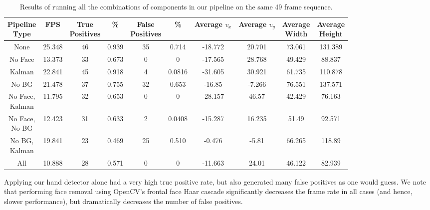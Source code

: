 \documentclass[12pt]{article}
\begin{document}
\noindent
\begin{table}[H]
\begin{center}
\begin{tabular}{|c|c|c|c|c|c|c|c|c|c|}
\hline
\shortstack{Pipeline \\ Type} &		FPS &	\shortstack{True \\ Positives} &	\% &		\shortstack{False \\ Positives }&	 \% &		\shortstack{Average \\ $v_x$} & 	\shortstack{Average \\ $v_y$} & 	\shortstack{Average \\ Width} &	\shortstack{Average \\Height} \\	\hline \hline
None    & 	25.348	  & 	46		        &	0.939     &		35                        &	0.714     &		-18.772 &	20.701 &	73.061 &	131.389	\\ \hline
No Face &	13.373 &	33 &	0.673 &	0 &	0 &	-17.565 &	28.768	& 49.429	& 88.837 \\ \hline
Kalman &	22.841 &	45	&0.918	&4	&0.0816&	-31.605	&30.921	&61.735&	110.878		\\ \hline
No BG	 & 21.478&	37	&0.755	&32	&0.653	&-16.85	&-7.266	&76.551	&137.571		\\ \hline
\shortstack{No Face, \\ Kalman}	&11.795&	32	&0.653&	0	&0&	-28.157	&46.57	&42.429&	76.163	\\ \hline
\shortstack{No Face, \\ No BG}	&12.423&	31	&0.633&	2	&0.0408&	-15.287&	16.235&	51.49&	92.571		\\ \hline
\shortstack{No BG, \\ Kalman}&	19.841&	23&	0.469	&25	&0.510	&-0.476	&-5.81	&66.265&	118.89	\\ \hline
All	&10.888&	28	&0.571&	0	&0	&-11.663&	24.01&	46.122	&82.939 \\
\hline
\end{tabular}
\end{center}
\label{data}
\caption{Results of running all the combinations of components in our pipeline on the same 49 frame sequence.}
\end{table}

Applying our hand detector alone had a very high true positive rate, but also generated many false positives as one would guess. We note that performing face removal using OpenCV's frontal face Haar cascade significantly decreases the frame rate in all cases (and hence, slower performance), but dramatically decreases the number of false positives. 
\end{document}
